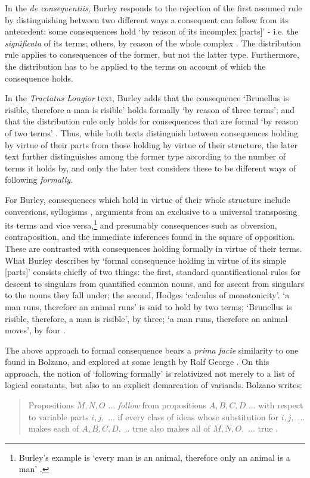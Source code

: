 \documentclass[]{article}
\begin{document}
In the \textit{de consequentiis}, Burley responds to the rejection of the first assumed rule by distinguishing between two different ways a consequent can follow from its antecedent: some consequences hold `by reason of its incomplex [parts]' - i.e. the \textit{significata} of its terms; others, by reason of the whole complex \cite[p. 118, par. 31]{Green-Pedersen1980b}. The distribution rule applies to consequences of the former, but not the latter type. Furthermore, the distribution has to be applied to the terms on account of which the consequence holds. 

In the \textit{Tractatus Longior} text, Burley adds that the consequence `Brunellus is risible, therefore a man is risible' holds formally `by reason of three terms'; and that the distribution rule only holds for consequences that are formal `by reason of two terms' \cite[pp. 84.11-85.17]{BurleyDPAL}. Thus, while both texts distinguish between consequences holding by virtue of their parts from those holding by virtue of their structure, the later text further distinguishes among the former type according to the number of terms it holds by, and only the later text considers these to be different ways of following \textit{formally}.

For Burley, consequences which hold in virtue of their whole structure include conversions, syllogisms \cite[p. 86.9-12]{BurleyDPAL}, arguments from an exclusive to a universal transposing its terms and vice versa,\footnote{Burley's example is `every man is an animal, therefore only an animal is a man' \cite[pp. 142-143, par. 118]{Green-Pedersen1980b}.} and presumably consequences such as obversion, contraposition, and the immediate inferences found in the square of opposition. These are contrasted with consequences holding formally in virtue of their terms. What Burley describes by `formal consequence holding in virtue of its simple [parts]' consists chiefly of two things: the first, standard quantificational rules for descent to singulars from quantified common nouns, and for ascent from singulars to the nouns they fall under; the second, Hodges `calculus of monotonicity'. `a man runs, therefore an animal runs' is said to hold by two terms; `Brunellus is risible, therefore, a man is risible', by three; `a man runs, therefore an animal moves', by four \cite[p. 84.24-27]{BurleyDPAL}.

The above approach to formal consequence bears a \textit{prima facie} similarity to one found in Bolzano, and explored at some length by Rolf George \cite{George1986}. On this approach, the notion of `following formally' is relativized not merely to a list of logical constants, but also to an explicit demarcation of variands. Bolzano writes: 
\begin{quote}
	Propositions $M, N, O$ ... \textit{follow} from propositions $A, B, C, D$ ... with respect to variable parts $i, j,$ ... if every class of ideas whose substitution for $i, j,$ ... makes each of $A, B, C, D,$ .. true also makes all of $M, N, O,$ ... true \cite[p. 209]{Bolzano1972}.
\end{quote}
\end{document}
